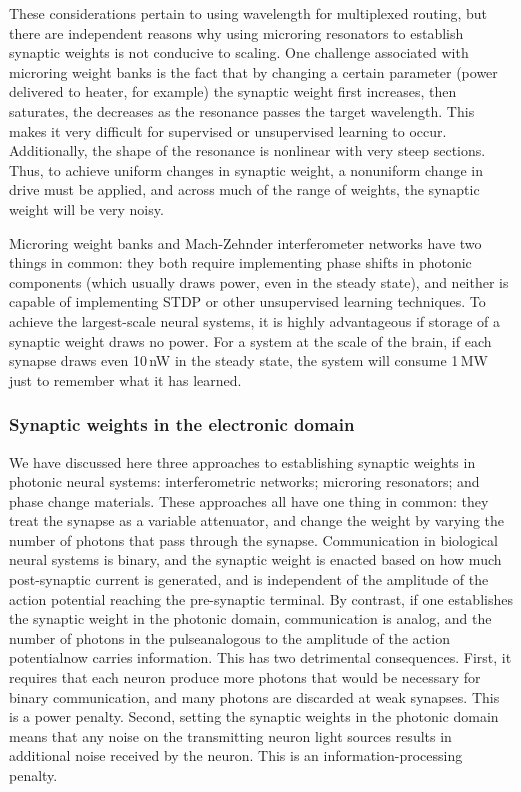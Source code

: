 These considerations pertain to using wavelength for multiplexed routing, but there are independent reasons why using microring resonators to establish synaptic weights is not conducive to scaling. One challenge associated with microring weight banks is the fact that by changing a certain parameter (power delivered to heater, for example) the synaptic weight first increases, then saturates, the decreases as the resonance passes the target wavelength. This makes it very difficult for supervised or unsupervised learning to occur. Additionally, the shape of the resonance is nonlinear with very steep sections. Thus, to achieve uniform changes in synaptic weight, a nonuniform change in drive must be applied, and across much of the range of weights, the synaptic weight will be very noisy.

Microring weight banks and Mach-Zehnder interferometer networks have two things in common: they both require implementing phase shifts in photonic components (which usually draws power, even in the steady state), and neither is capable of implementing STDP or other unsupervised learning techniques. To achieve the largest-scale neural systems, it is highly advantageous if storage of a synaptic weight draws no power. For a system at the scale of the brain, if each synapse draws even 10\,nW in the steady state, the system will consume 1\,MW just to remember what it has learned. 

\cite{tach2015}

\cite{tafe2019}


\subsubsection{Synaptic weights in the electronic domain}
We have discussed here three approaches to establishing synaptic weights in photonic neural systems: interferometric networks; microring resonators; and phase change materials. These approaches all have one thing in common: they treat the synapse as a variable attenuator, and change the weight by varying the number of photons that pass through the synapse. Communication in biological neural systems is binary, and the synaptic weight is enacted based on how much post-synaptic current is generated, and is independent of the amplitude of the action potential reaching the pre-synaptic terminal. By contrast, if one establishes the synaptic weight in the photonic domain, communication is analog, and the number of photons in the pulse\textemdash analogous to the amplitude of the action potential\textemdash now carries information. This has two detrimental consequences. First, it requires that each neuron produce more photons that would be necessary for binary communication, and many photons are discarded at weak synapses. This is a power penalty. Second, setting the synaptic weights in the photonic domain means that any noise on the transmitting neuron light sources results in additional noise received by the neuron. This is an information-processing penalty.


